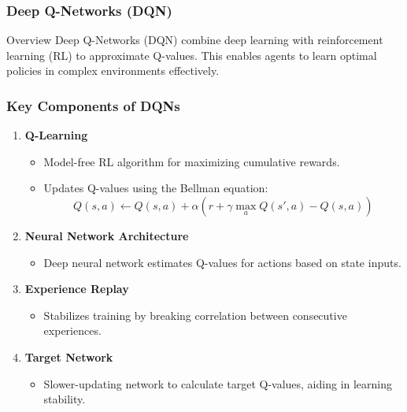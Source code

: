\documentclass[aspectratio=169]{beamer}
\begin{document}
\begin{frame}
    \frametitle{Deep Q-Networks (DQN)}
    \begin{block}{Overview}
        Deep Q-Networks (DQN) combine deep learning with reinforcement learning (RL) to approximate Q-values. This enables agents to learn optimal policies in complex environments effectively.
    \end{block}
\end{frame}

\begin{frame}
    \frametitle{Key Components of DQNs}
    \begin{enumerate}
        \item \textbf{Q-Learning}
            \begin{itemize}
                \item Model-free RL algorithm for maximizing cumulative rewards.
                \item Updates Q-values using the Bellman equation:
                \begin{equation}
                    Q(s, a) \leftarrow Q(s, a) + \alpha \left( r + \gamma \max_a Q(s', a) - Q(s, a) \right)
                \end{equation}
            \end{itemize}
        \item \textbf{Neural Network Architecture}
            \begin{itemize}
                \item Deep neural network estimates Q-values for actions based on state inputs.
            \end{itemize}
        \item \textbf{Experience Replay}
            \begin{itemize}
                \item Stabilizes training by breaking correlation between consecutive experiences.
            \end{itemize}
        \item \textbf{Target Network}
            \begin{itemize}
                \item Slower-updating network to calculate target Q-values, aiding in learning stability.
            \end{itemize}
    \end{enumerate}
\end{frame}
\end{document}
